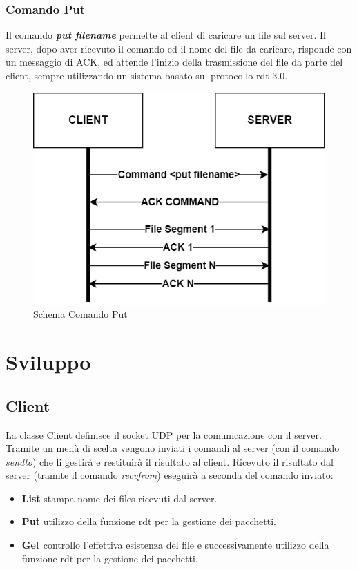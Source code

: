 \documentclass{article}
\begin{document}
\subsubsection{Comando Put}


Il comando \textbf{\emph{put filename}} permette al client di caricare un file sul server. Il server, dopo aver ricevuto il comando ed il nome del file da caricare, risponde con un messaggio di ACK,
ed attende l'inizio della trasmissione del file da parte del client, sempre utilizzando un sistema basato sul protocollo rdt 3.0.

\begin{figure}[!htb]
  \includegraphics[width=\linewidth]{commandPut.png}
  \caption{Schema Comando Put}
\end{figure}

\newpage
\section{Sviluppo}
\subsection{Client}


La classe Client definisce il socket UDP per la comunicazione con il server.
Tramite un menù di scelta vengono inviati i comandi al server (con il comando  \textit{sendto}) che li gestirà e restituirà il risultato al client.
Ricevuto il risultato dal server (tramite il comando \textit{recvfrom}) eseguirà a seconda del comando inviato:
\begin{itemize}
    \item \textbf{List} stampa nome dei files ricevuti dal server.
    \item \textbf{Put} utilizzo della funzione rdt per la gestione dei pacchetti.
    \item \textbf{Get} controllo l'effettiva esistenza del file e successivamente utilizzo della funzione rdt per la gestione dei pacchetti.
\end{itemize}
\end{document}
